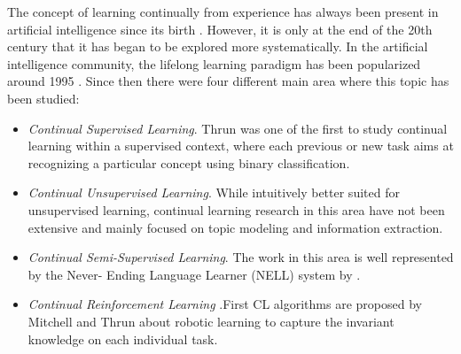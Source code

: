 \documentclass[english, LaM, oneside]{sapthesis}%
\begin{document}
The concept of learning continually from experience has always been present in artificial intelligence since its birth \cite{turing,weng}. However, it is only at the end of the 20th century that it has began to be explored more systematically. In the artificial intelligence community, the lifelong learning paradigm has been popularized around 1995 \cite{ring,thrun-mitchell,thrun}. Since then there were four different main area where this topic has been studied:
\begin{itemize}
    \item \textit{Continual Supervised Learning}. Thrun \cite{thrun} was one of the first to study continual learning within a supervised context, where each previous or new task aims at recognizing a particular concept using binary classification.
    \item \textit{Continual Unsupervised Learning}. While intuitively better suited for unsupervised learning, continual learning research in this area have not been extensive and mainly focused on topic modeling and information extraction.
    \item \textit{Continual Semi-Supervised Learning}. The work in this area is well represented by the Never- Ending Language Learner (NELL) system by \cite{carloson}.
    \item \textit{Continual Reinforcement Learning} .First CL algorithms are proposed by Mitchell and Thrun \cite{mithcell-thrun} about robotic learning to capture  the invariant knowledge on each individual task.
\end{itemize}
\end{document}
